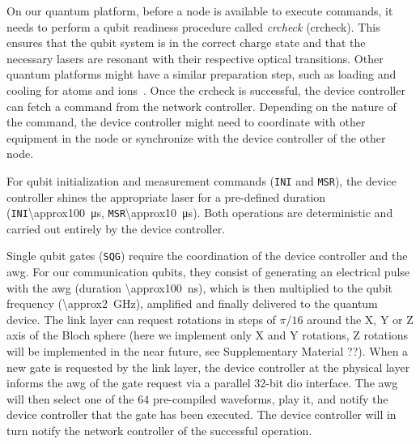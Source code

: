On our quantum platform, before a node is available to execute commands, it needs to perform a qubit
readiness procedure called \emph{\acrlong{crcheck}} (\acrshort{crcheck}). This ensures that the
qubit system is in the correct charge state and that the necessary lasers are resonant with their
respective optical transitions. Other quantum platforms might have a similar preparation step, such
as loading and cooling for atoms and ions~\cite{stephenson_2020_highrate, ritter_2012_elementary}.
Once the \acrshort{crcheck} is successful, the device controller can fetch a command from the
network controller. Depending on the nature of the command, the device controller might need to
coordinate with other equipment in the node or synchronize with the device controller of the other
node.

For qubit initialization and measurement commands (\texttt{INI} and \texttt{MSR}), the device
controller shines the appropriate laser for a pre-defined duration
(\texttt{INI}\qty{\approx100}{\us}, \texttt{MSR}\qty{\approx10}{\us}). Both operations are
deterministic and carried out entirely by the device controller.

Single qubit gates (\texttt{SQG}) require the coordination of the device controller and the
\acrshort{awg}. For our communication qubits, they consist of generating an electrical pulse with
the \acrshort{awg} (duration \qty{\approx100}{\ns}), which is then multiplied to the qubit frequency
(\qty{\approx2}{\GHz}), amplified and finally delivered to the quantum device. The link layer can
request rotations in steps of $\pi/16$ around the X, Y or Z axis of the Bloch sphere (here we
implement only X and Y rotations, Z rotations will be implemented in the near future, see
Supplementary Material ??). When a new gate is requested by the link layer, the device controller at
the physical layer informs the \acrshort{awg} of the gate request via a parallel \num{32}-bit
\acrshort{dio} interface. The \acrshort{awg} will then select one of the $64$ pre-compiled
waveforms, play it, and notify the device controller that the gate has been executed. The device
controller will in turn notify the network controller of the successful operation.

